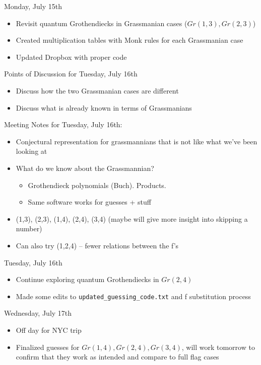 Monday, July 15th
\begin{itemize}
    \item Revisit quantum Grothendiecks in Grassmanian cases ($Gr(1, 3), Gr(2, 3)$)
    \item Created multiplication tables with Monk rules for each Grassmanian case
    \item Updated Dropbox with proper code
\end{itemize}

Points of Discussion for Tuesday, July 16th
\begin{itemize}
    \item Discuss how the two Grassmanian cases are different
    \item Discuss what is already known in terms of Grassmanians
\end{itemize}

Meeting Notes for Tuesday, July 16th:
\begin{itemize}
    \item Conjectural representation for grassmannians that is not like what we've been looking at
    \item What do we know about the Grassmannian?
    \begin{itemize}
        \item Grothendieck polynomials (Buch). Products. 
        \item Same software works for guesses + stuff
    \end{itemize}
    \item (1,3), (2,3), (1,4), (2,4), (3,4) (maybe will give more insight into skipping a number)
    \item Can also try (1,2,4) -- fewer relations between the f's
\end{itemize}

Tuesday, July 16th
\begin{itemize}
    \item Continue exploring quantum Grothendiecks in $Gr(2, 4)$
    \item Made some edits to \texttt{updated\_guessing\_code.txt} and f substitution process
\end{itemize}

Wednesday, July 17th
\begin{itemize}
    \item Off day for NYC trip
    \item Finalized guesses for $Gr(1, 4), Gr(2, 4), Gr(3, 4)$, will work tomorrow to confirm that they work as intended and compare to full flag cases
\end{itemize}

